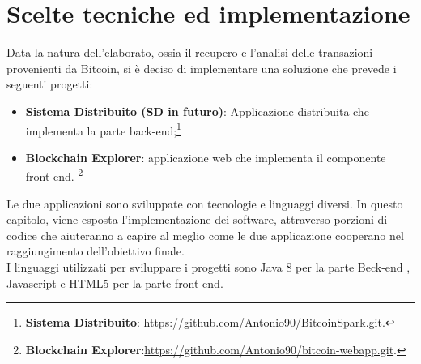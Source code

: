 \chapter{Scelte tecniche ed implementazione}
\label{chap:implementazione}
Data la natura dell'elaborato, ossia il recupero e l'analisi delle transazioni provenienti da Bitcoin, si è deciso di implementare una soluzione che prevede i seguenti progetti:
\begin{itemize}
\item \textbf{Sistema Distribuito (SD in futuro)}: Applicazione distribuita che implementa la parte back-end;\footnote{\textbf{Sistema Distribuito}: \href{https://github.com/Antonio90/BitcoinSpark.git}{https://github.com/Antonio90/BitcoinSpark.git}.}
\item \textbf{Blockchain Explorer}: applicazione web che implementa il componente front-end. \footnote{\textbf{Blockchain Explorer}:\href{https://github.com/Antonio90/bitcoin-webapp.git}{https://github.com/Antonio90/bitcoin-webapp.git}.}
\end{itemize}
Le due applicazioni sono sviluppate con tecnologie e linguaggi diversi. In questo capitolo, viene esposta l'implementazione dei software, attraverso porzioni di codice  che aiuteranno a capire al meglio come le due applicazione cooperano nel raggiungimento dell'obiettivo finale.
\\ I linguaggi utilizzati per sviluppare i progetti sono Java 8 per la parte Beck-end , Javascript e HTML5 per la parte front-end.

